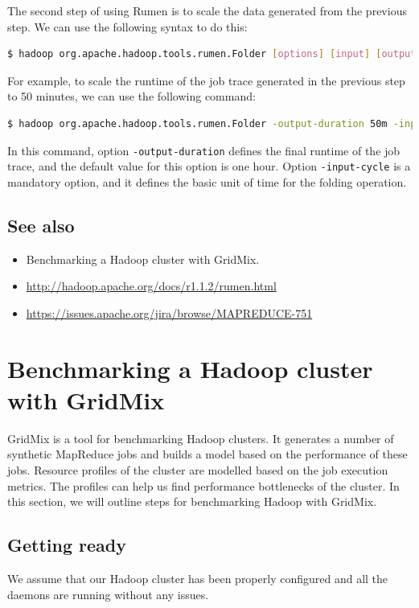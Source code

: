 The second step of using Rumen is to scale the data generated from the previous step. We can use the following syntax to do this:
\lstset{style=bashstyle}
\begin{lstlisting}[language=bash]
$ hadoop org.apache.hadoop.tools.rumen.Folder [options] [input] [output]
\end{lstlisting}

For example, to scale the runtime of the job trace generated in the previous step to 50 minutes, we can use the following command:
\lstset{style=bashstyle}
\begin{lstlisting}[language=bash]
$ hadoop org.apache.hadoop.tools.rumen.Folder -output-duration 50m -input-cycle 20m file:///home/hduser/jobtraces.json file:///home/hduser/job-scaled-50min.json
\end{lstlisting}

In this command, option \verb|-output-duration| defines the final runtime of the job trace, and the default value for this option is one hour. Option \verb|-input-cycle| is a mandatory option, and it defines the basic unit of time for the folding operation.
\subsection*{See also}
\begin{itemize}
  \item Benchmarking a Hadoop cluster with GridMix.
  \item \url{http://hadoop.apache.org/docs/r1.1.2/rumen.html}
  \item \url{https://issues.apache.org/jira/browse/MAPREDUCE-751}
\end{itemize}
\section{Benchmarking a Hadoop cluster with GridMix}
GridMix is a tool for benchmarking Hadoop clusters. It generates a number of synthetic MapReduce jobs and builds a model based on the performance of these jobs. Resource profiles of the cluster are modelled based on the job execution metrics. The profiles can help us find performance bottlenecks of the cluster. In this section, we will outline steps for benchmarking Hadoop with GridMix.
\subsection*{Getting ready}
We assume that our Hadoop cluster has been properly configured and all the daemons are running without any issues.

